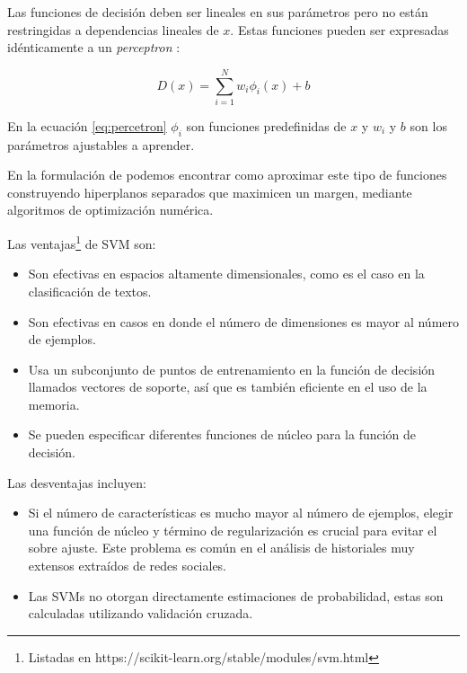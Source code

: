 Las funciones de decisión deben ser lineales en sus parámetros pero no están restringidas a dependencias lineales de $x$. Estas funciones pueden ser expresadas idénticamente a un \textit{perceptron }\citep{block1962analysis}:

\begin{equation} \label{eq:percetron}
    D(x) = \sum_{i=1}^{N} w_i\phi_i(x) + b
\end{equation}

En la ecuación \ref{eq:percetron} $ \phi_i$ son funciones predefinidas de $x$ y $w_i$ y $b$ son los parámetros ajustables a aprender.

En la formulación de \citep{boser1992training, cortes1995support} podemos encontrar como aproximar este tipo de funciones construyendo hiperplanos separados que maximicen un margen, mediante algoritmos de optimización numérica.

Las ventajas\footnote{Listadas en https://scikit-learn.org/stable/modules/svm.html} de SVM son: 
\begin{itemize}
    \item Son efectivas en espacios altamente dimensionales, como es el caso en la clasificación de textos.
    \item Son efectivas en casos en donde el número de dimensiones es mayor al número de ejemplos.
    \item Usa un subconjunto de puntos de entrenamiento en la función de decisión llamados vectores de soporte, así que es también eficiente en el uso de la memoria.
    \item Se pueden especificar diferentes funciones de núcleo para la función de decisión. 
\end{itemize}

Las desventajas incluyen:
\begin{itemize}
    \item Si el número de características es mucho mayor al número de ejemplos, elegir una función de núcleo y término de regularización es crucial para evitar el sobre ajuste. Este problema es común en el análisis de historiales muy extensos extraídos de redes sociales.
    \item Las SVMs no otorgan directamente estimaciones de probabilidad, estas son calculadas utilizando validación cruzada.
    
\end{itemize}
    
    
    

